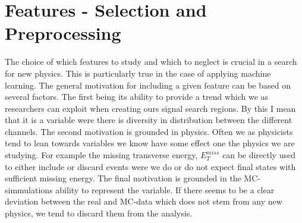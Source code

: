 \section{Features - Selection and Preprocessing}
The choice of which features to study and which to neglect is crucial in a search for new physics. This is particularly true 
in the case of applying machine learning. The general motivation for including a given feature can be based on several factors. 
The first being its ability to provide a trend which we as researchers can exploit when creating ours signal search regions. By this I mean
that it is a variable were there is diversity in distribution between the different channels. The second motivation is grounded in 
physics. Often we as physicists tend to lean towards variables we know have some effect one the physics we are studying. For 
example the missing transverse energy, $E_T^{miss}$ can be directly used to either include or discard events were we do or do not expect final states
with sufficient missing energy. The final motivation is grounded in the \ac{MC}-simmulations ability to represent the variable.
If there seems to be a clear deviation between the real and \ac{MC}-data which does not stem from any new physics, we tend to discard
them from the analysis.
